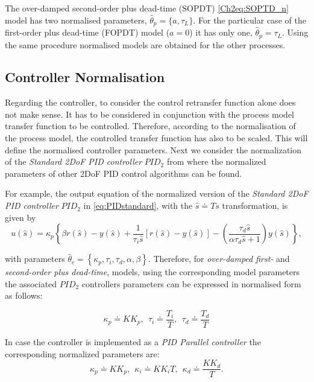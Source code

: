 The over-damped second-order plus dead-time (SOPDT) \eqref{Ch2eq:SOPTD_n} model has two normalised parameters, $\hat{\theta}_p = \{a, \tau_L\}$.  For the particular case of the first-order plus dead-time (FOPDT) model ($a=0$) it has only one, $\hat{\theta}_p = \tau_L$. Using the same procedure normalised models are obtained for the other processes.\\


\subsection{Controller Normalisation}
\label{sec:3.3}

Regarding the controller, to consider the control retransfer function alone does not make sense. It has to be considered in conjunction with the process model transfer function to be controlled. Therefore, according to the normalisation of the process model, the controlled transfer function has also to be scaled. This will define the normalised controller parameters. Next we consider the normalization of the \emph{Standard 2DoF PID controller} $PID_2$ from where the normalized parameters of other 2DoF PID control algorithms can be found.

For example, the output equation of the normalized version of the \emph{Standard 2DoF PID controller} $PID_2$ in \eqref{eq:PIDstandard}, with the $\hat s \doteq T s$ transformation, is given by
\begin{equation}
	u(\hat s) = \kappa_p \left\{\beta r(\hat s)-y(\hat s) + \frac{1}{\tau_i \hat s} \left[r(\hat s)-y(\hat s)\right] - \left(\frac{\tau_d \hat s}{\alpha \tau_d \hat s+1}\right) y(\hat s)\right\},
\end{equation}

\noindent with parameters $\hat{\theta}_c = \left\{\kappa_p, \tau_i, \tau_d, \alpha, \beta \right\}$. Therefore,  for \emph{over-damped first-} and \emph{second-order plus dead-time},  models, using the corresponding model parameters the associated $PID_2$ controllers parameters can be expressed in normalised form as follows:

\begin{equation}
	\kappa_p \doteq K K_p, \ \ \tau_i \doteq \frac{T_i}{T}, \ \ \tau_d \doteq \frac{T_d}{T} 
	\label{Ch2eq:PIDNormalized}
\end{equation}

In case the controller is implemented as a \emph{PID Parallel controller} the corresponding normalized parameters are:
\begin{equation}
	\kappa_p \doteq K K_p, \ \ \kappa_i \doteq K K_i T, \ \ \kappa_d \doteq \frac{K K_d}{T}.	
\end{equation}


